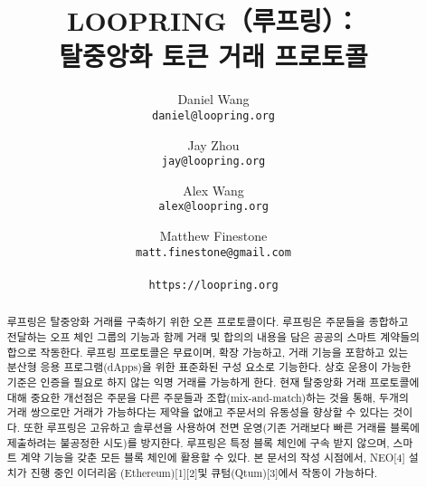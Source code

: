 \documentclass{article}
\title{\textbf{LOOPRING（루프링）：\\ 탈중앙화 토큰 거래 프로토콜}}
\author{	
	Daniel Wang\\	
	\texttt{daniel@loopring.org}\\	
	\and	
	Jay Zhou\\	
	\texttt{jay@loopring.org}\\	
	\and	
	Alex Wang\\	
	\texttt{alex@loopring.org}\\	
	\and	
	Matthew Finestone\\	
	\texttt{matt.finestone@gmail.com}\\	
	\\	
	\texttt{https://loopring.org}	
}
\begin{document}
\maketitle

\begin{abstract}
루프링은 탈중앙화 거래를 구축하기 위한 오픈 프로토콜이다. 루프링은 주문들을 종합하고 전달하는 오프 체인 그룹의 기능과 함께 거래 및 합의의 내용을 담은 공공의 스마트 계약들의 합으로 작동한다. 루프링 프로토콜은 무료이며, 확장 가능하고, 거래 기능을 포함하고 있는 분산형 응용 프로그램(dApps)을 위한 표준화된 구성 요소로 기능한다. 상호 운용이 가능한 기준은 인증을 필요로 하지 않는 익명 거래를 가능하게 한다. 현재 탈중앙화 거래 프로토콜에 대해 중요한 개선점은 주문을 다른 주문들과 조합(mix-and-match)하는 것을 통해, 두개의 거래 쌍으로만 거래가 가능하다는 제약을 없애고 주문서의 유동성을 향상할 수 있다는 것이다. 또한 루프링은 고유하고 솔루션을 사용하여 전면 운영(기존 거래보다 빠른 거래를 블록에 제출하려는 불공정한 시도)를 방지한다. 루프링은 특정 블록 체인에 구속 받지 않으며, 스마트 계약 기능을 갖춘 모든 블록 체인에 활용할 수 있다. 본 문서의 작성 시점에서, NEO[4] 설치가 진행 중인 이더리움 (Ethereum)[1][2]및 큐텀(Qtum)[3]에서 작동이 가능하다.
\end{abstract}
\end{document}
